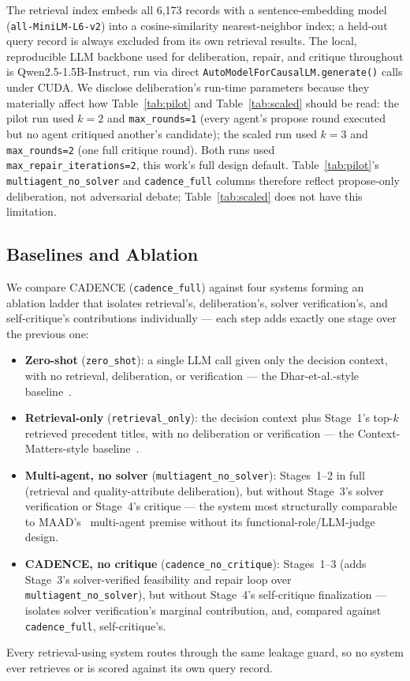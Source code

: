 \documentclass[lettersize,journal]{IEEEtran}
\begin{document}
The retrieval index embeds all 6{,}173 records with a sentence-embedding model (\texttt{all-MiniLM-L6-v2}) into a cosine-similarity nearest-neighbor index; a held-out query record is always excluded from its own retrieval results. The local, reproducible LLM backbone used for deliberation, repair, and critique throughout is Qwen2.5-1.5B-Instruct, run via direct \texttt{AutoModelForCausalLM.generate()} calls under CUDA. We disclose deliberation's run-time parameters because they materially affect how Table~\ref{tab:pilot} and Table~\ref{tab:scaled} should be read: the pilot run used $k=2$ and \texttt{max\_rounds=1} (every agent's propose round executed but no agent critiqued another's candidate); the scaled run used $k=3$ and \texttt{max\_rounds=2} (one full critique round). Both runs used \texttt{max\_repair\_iterations=2}, this work's full design default. Table~\ref{tab:pilot}'s \texttt{multiagent\_no\_solver} and \texttt{cadence\_full} columns therefore reflect propose-only deliberation, not adversarial debate; Table~\ref{tab:scaled} does not have this limitation.

\subsection{Baselines and Ablation}

We compare CADENCE (\texttt{cadence\_full}) against four systems forming an ablation ladder that isolates retrieval's, deliberation's, solver verification's, and self-critique's contributions individually --- each step adds exactly one stage over the previous one:

\begin{itemize}[leftmargin=*,itemsep=1pt,topsep=2pt,parsep=0pt]
\item \textbf{Zero-shot} (\texttt{zero\_shot}): a single LLM call given only the decision context, with no retrieval, deliberation, or verification --- the Dhar-et-al.-style baseline~\cite{dhar2024llm}.
\item \textbf{Retrieval-only} (\texttt{retrieval\_only}): the decision context plus Stage~1's top-$k$ retrieved precedent titles, with no deliberation or verification --- the Context-Matters-style baseline~\cite{contextmatters2026}.
\item \textbf{Multi-agent, no solver} (\texttt{multiagent\_no\_solver}): Stages~1--2 in full (retrieval and quality-attribute deliberation), but without Stage~3's solver verification or Stage~4's critique --- the system most structurally comparable to MAAD's~\cite{maad2025} multi-agent premise without its functional-role/LLM-judge design.
\item \textbf{CADENCE, no critique} (\texttt{cadence\_no\_critique}): Stages~1--3 (adds Stage~3's solver-verified feasibility and repair loop over \texttt{multiagent\_no\_solver}), but without Stage~4's self-critique finalization --- isolates solver verification's marginal contribution, and, compared against \texttt{cadence\_full}, self-critique's.
\end{itemize}
Every retrieval-using system routes through the same leakage guard, so no system ever retrieves or is scored against its own query record.
\end{document}
